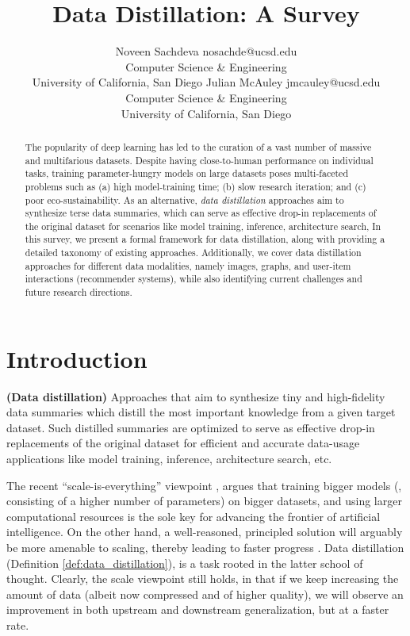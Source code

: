 \documentclass[10pt]{article} %
\title{Data Distillation: A Survey}
\author{\name Noveen Sachdeva \email nosachde@ucsd.edu \\
      \addr Computer Science \& Engineering\\
      University of California, San Diego
      \AND
      \name Julian McAuley \email jmcauley@ucsd.edu \\
      \addr Computer Science \& Engineering\\
      University of California, San Diego%
      }
\begin{document}
\maketitle

\begin{abstract}
    The popularity of deep learning has led to the curation of a vast number of massive and multifarious datasets. Despite having close-to-human performance on individual tasks, training parameter-hungry models on large datasets poses multi-faceted problems such as (a) high model-training time; (b) slow research iteration; and (c) poor eco-sustainability. As an alternative, \emph{data distillation} approaches aim to synthesize terse data summaries, which can serve as effective drop-in replacements of the original dataset for scenarios like model training, inference, architecture search, \etc
    In this survey, we present a formal framework for data distillation, along with providing a detailed taxonomy of existing approaches. Additionally, we cover data distillation approaches for different data modalities, namely images, graphs, and user-item interactions (recommender systems), while also identifying current challenges and future research directions. %
\end{abstract}

\section{Introduction}
\begin{loosedefinition} \label{def:data_distillation}
    {\normalfont \textbf{(Data distillation)}} Approaches that aim to synthesize tiny and high-fidelity data summaries which distill the most important knowledge from a given target dataset. Such distilled summaries are optimized to serve as effective drop-in replacements of the original dataset for efficient and accurate data-usage applications like model training, inference, architecture search, etc.
\end{loosedefinition}

The recent ``scale-is-everything'' viewpoint \citep{scaling_1, scaling_2, scaling_3}, argues that training bigger models (\ie, consisting of a higher number of parameters) on bigger datasets, and using larger computational resources is the sole key for advancing the frontier of artificial intelligence.
On the other hand, a well-reasoned, principled solution will arguably be more amenable to scaling, thereby leading to faster progress \citep{data_quality}. Data distillation (Definition \ref{def:data_distillation}), is a task rooted in the latter school of thought. Clearly, the scale viewpoint still holds, in that if we keep increasing the amount of data (albeit now compressed and of higher quality), we will observe an improvement in both upstream and downstream generalization, but at a faster rate.
\end{document}
